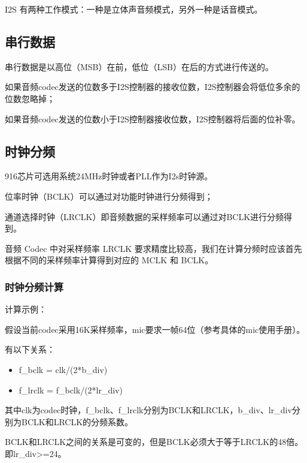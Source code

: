 \documentclass[
  12pt,
]{book}
\begin{document}
I2S 有两种工作模式：一种是立体声音频模式，另外一种是话音模式。

\hypertarget{ux4e32ux884cux6570ux636e}{%
\subsection{串行数据}\label{ux4e32ux884cux6570ux636e}}

串行数据是以高位（MSB）在前，低位（LSB）在后的方式进行传送的。

如果音频codec发送的位数多于I2S控制器的接收位数，I2S控制器会将低位多余的位数忽略掉；

如果音频codec发送的位数小于I2S控制器接收位数，I2S控制器将后面的位补零。

\hypertarget{ux65f6ux949fux5206ux9891}{%
\subsection{时钟分频}\label{ux65f6ux949fux5206ux9891}}

916芯片可选用系统24MHz时钟或者PLL作为I2s时钟源。

位率时钟（BCLK）可以通过对功能时钟进行分频得到；

通道选择时钟（LRCLK）即音频数据的采样频率可以通过对BCLK进行分频得到。

音频 Codec 中对采样频率 LRCLK 要求精度比较高，我们在计算分频时应该首先根据不同的采样频率计算得到对应的 MCLK 和 BCLK。

\hypertarget{ux65f6ux949fux5206ux9891ux8ba1ux7b97}{%
\subsubsection{时钟分频计算}\label{ux65f6ux949fux5206ux9891ux8ba1ux7b97}}

计算示例：

假设当前codec采用16K采样频率，mic要求一帧64位（参考具体的mic使用手册）。

有以下关系：

\begin{itemize}
\item
  f\_bclk = clk/(2*b\_div)
\item
  f\_lrclk = f\_bclk/(2*lr\_div)
\end{itemize}

其中clk为codec时钟，f\_bclk、f\_lrclk分别为BCLK和LRCLK，b\_div、lr\_div分别为BCLK和LRCLK的分频系数。

BCLK和LRCLK之间的关系是可变的，但是BCLK必须大于等于LRCLK的48倍。即lr\_div\textgreater=24。
\end{document}
